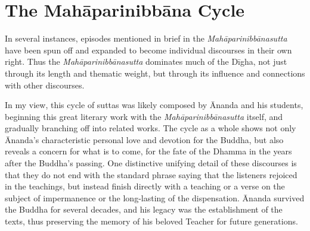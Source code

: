 \documentclass[12pt,openany]{book}%
\begin{document}
\section*{The \textsanskrit{Mahāparinibbāna} Cycle}

In several instances, episodes mentioned in brief in the \textit{\textsanskrit{Mahāparinibbānasutta}} have been spun off and expanded to become individual discourses in their own right. Thus the \textit{\textsanskrit{Mahāparinibbānasutta}} dominates much of the \textsanskrit{Dīgha}, not just through its length and thematic weight, but through its influence and connections with other discourses.

In my view, this cycle of suttas was likely composed by Ānanda and his students, beginning this great literary work with the \textit{\textsanskrit{Mahāparinibbānasutta}} itself, and gradually branching off into related works. The cycle as a whole shows not only Ānanda’s characteristic personal love and devotion for the Buddha, but also reveals a concern for what is to come, for the fate of the Dhamma in the years after the Buddha’s passing. One distinctive unifying detail of these discourses is that they do not end with the standard phrase saying that the listeners rejoiced in the teachings, but instead finish directly with a teaching or a verse on the subject of impermanence or the long-lasting of the dispensation. Ānanda survived the Buddha for several decades, and his legacy was the establishment of the texts, thus preserving the memory of his beloved Teacher for future generations.
\end{document}
